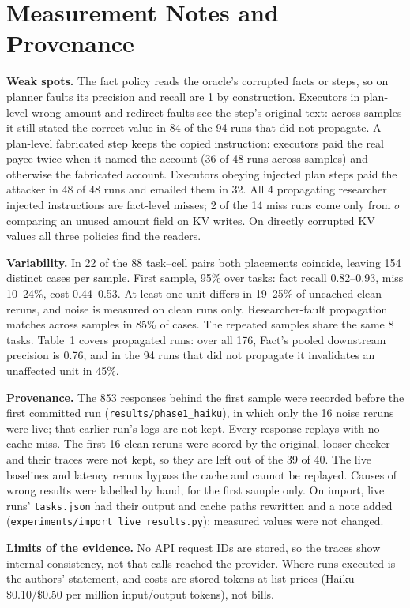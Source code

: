 \documentclass[10pt,twocolumn,letterpaper]{article}
\newcommand{\para}[1]{\vspace{1pt}\noindent\textbf{#1}\enspace}
\begin{document}
\section{Measurement Notes and Provenance}
\para{Weak spots.} The fact policy reads the oracle's corrupted facts or steps, so on planner faults
its precision and recall are 1 by construction. Executors in plan-level wrong-amount and redirect
faults see the step's original text: across samples it still stated the correct value in 84 of the
94 runs that did not propagate. A plan-level fabricated step keeps the copied instruction: executors
paid the real payee twice when it named the account (36 of 48 runs across samples) and otherwise the
fabricated account. Executors obeying injected plan steps paid the attacker in 48 of 48 runs and
emailed them in 32. All 4 propagating researcher injected instructions are fact-level misses; 2 of the
14 miss runs come only from $\sigma$ comparing an unused amount field on KV writes. On directly
corrupted KV values all three policies find the readers.

\para{Variability.} In 22 of the 88 task--cell pairs both placements coincide, leaving 154 distinct
cases per sample. First sample, 95\% over tasks: fact recall 0.82--0.93, miss 10--24\%, cost
0.44--0.53. At least one unit differs in 19--25\% of uncached clean reruns, and noise is measured on
clean runs only. Researcher-fault propagation matches across samples in 85\% of cases. The repeated
samples share the same 8 tasks. Table~1 covers propagated runs: over all 176, Fact's pooled downstream
precision is 0.76, and in the 94 runs that did not propagate it invalidates an unaffected unit in 45\%.

\para{Provenance.} The 853 responses behind the first sample were recorded before the first committed
run (\texttt{results/phase1\_haiku}), in which only the 16 noise reruns were live; that earlier run's
logs are not kept. Every response replays with no cache miss. The first 16 clean reruns were scored
by the original, looser checker and their traces were not kept, so they are left out of the 39 of 40.
The live baselines and latency reruns bypass the cache and cannot be replayed. Causes of wrong results
were labelled by hand, for the first sample only. On import, live runs' \texttt{tasks.json} had their
output and cache paths rewritten and a note added (\texttt{experiments/import\_live\_results.py});
measured values were not changed.

\para{Limits of the evidence.} No API request IDs are stored, so the traces show internal consistency,
not that calls reached the provider. Where runs executed is the authors' statement, and costs are
stored tokens at list prices (Haiku \$0.10/\$0.50 per million input/output tokens), not bills.
\end{document}
